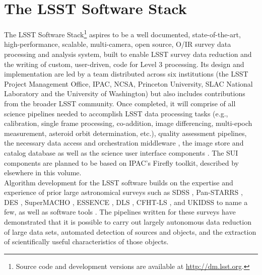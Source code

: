 \documentclass[11pt,twoside]{article}
\begin{document}
\section{The LSST Software Stack}
\label{sec:dmstack}

The LSST Software Stack\footnote{Source code and development versions are available at
\url{http://dm.lsst.org}.} aspires to be a well documented, state-of-the-art,
high-performance, scalable, multi-camera, open source, O/IR survey
data processing and analysis system, built to enable LSST survey data
reduction and the writing of custom, user-driven, code for Level 3
processing. Its design and implementation are led by a team distributed
across six institutions (the LSST Project Management Office, IPAC, NCSA,
Princeton University, SLAC National Laboratory and the University
of Washington) but also includes contributions from the broader LSST
community. Once completed, it will comprise of
all science pipelines \citep{LDM-151, LDM-156} needed to accomplish LSST data processing tasks
(e.g., calibration, single frame processing, co-addition, image
differencing, multi-epoch measurement, asteroid orbit determination,
etc.), quality assessment pipelines, the necessary data
access and orchestration middleware \citep{LDM-152}, the
image store and catalog database \citep{LDM-135}
as well as the science user interface components \citep[SUI;][]{LDM-131}.
The SUI components are planned to be based on IPAC's Firefly toolkit,
described by \citet{O10-1_adassxxv} elsewhere in this volume.
\\

Algorithm development for the LSST software builds on the expertise
and experience of prior large astronomical surveys such as
SDSS \citep{2000AJ....120.1579Y},
Pan-STARRS \citep{2006amos.confE..50M,2010SPIE.7733E..0EK},
DES \citep{DESDM},
SuperMACHO \citep{2005IAUS..225..357B},
ESSENCE \citep{2007ApJ...666..674M},
DLS \citep{2002SPIE.4836...73W},
CFHT-LS \citep{2012MNRAS.427..146H, 2013MNRAS.429.2858M, 2012AJ....143...38G},
and UKIDSS \citep{2007MNRAS.379.1599L}
to name a few, as well as software tools
\citep[e.g., SExtractor,][ascl:1010.064]{1996A&AS..117..393B}.
The pipelines written for these surveys have demonstrated that it is
possible to carry out largely autonomous data reduction of large data
sets, automated detection of sources and objects, and the
extraction of scientifically useful characteristics of those objects.
\end{document}
